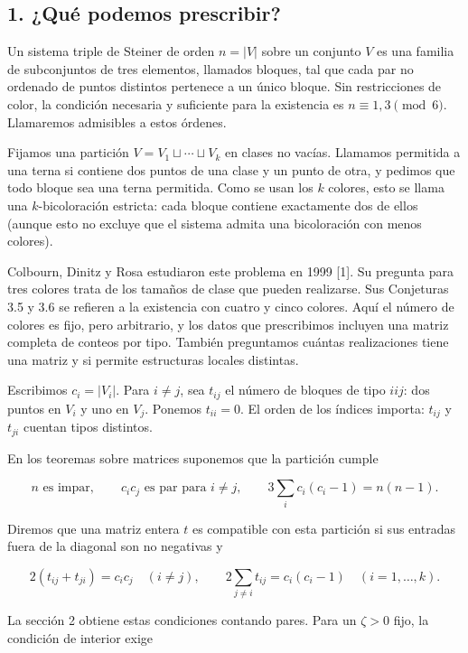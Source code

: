 \documentclass[spanish,11pt,a4paper]{article}
\begin{document}
\subsection{1. ¿Qué podemos prescribir?}\label{quuxe9-podemos-prescribir}

Un sistema triple de Steiner de orden \(n=|V|\) sobre un conjunto \(V\) es una familia de subconjuntos de tres elementos, llamados bloques, tal que cada par no ordenado de puntos distintos pertenece a un único bloque. Sin restricciones de color, la condición necesaria y suficiente para la existencia es \(n\equiv1,3\pmod6\). Llamaremos admisibles a estos órdenes.

Fijamos una partición \(V=V_1\sqcup\cdots\sqcup V_k\) en clases no vacías. Llamamos permitida a una terna si contiene dos puntos de una clase y un punto de otra, y pedimos que todo bloque sea una terna permitida. Como se usan los \(k\) colores, esto se llama una \(k\)-bicoloración estricta: cada bloque contiene exactamente dos de ellos (aunque esto no excluye que el sistema admita una bicoloración con menos colores).

Colbourn, Dinitz y Rosa estudiaron este problema en 1999 {[}1{]}. Su pregunta para tres colores trata de los tamaños de clase que pueden realizarse. Sus Conjeturas 3.5 y 3.6 se refieren a la existencia con cuatro y cinco colores. Aquí el número de colores es fijo, pero arbitrario, y los datos que prescribimos incluyen una matriz completa de conteos por tipo. También preguntamos cuántas realizaciones tiene una matriz y si permite estructuras locales distintas.

Escribimos \(c_i=|V_i|\). Para \(i\ne j\), sea \(t_{ij}\) el número de bloques de tipo \(iij\): dos puntos en \(V_i\) y uno en \(V_j\). Ponemos \(t_{ii}=0\). El orden de los índices importa: \(t_{ij}\) y \(t_{ji}\) cuentan tipos distintos.

En los teoremas sobre matrices suponemos que la partición cumple

\[n\text{ es impar},\qquad c_ic_j\text{ es par para }i\ne j,
\qquad 3\sum_i c_i(c_i-1)=n(n-1).
\tag{1.1}\]

Diremos que una matriz entera \(t\) es compatible con esta partición si sus entradas fuera de la diagonal son no negativas y

\[2(t_{ij}+t_{ji})=c_ic_j\quad(i\ne j),\qquad
2\sum_{j\ne i}t_{ij}=c_i(c_i-1)\quad(i=1,\ldots,k).
\tag{1.2}\]

La sección 2 obtiene estas condiciones contando pares. Para un \(\zeta>0\) fijo, la condición de interior exige
\end{document}
